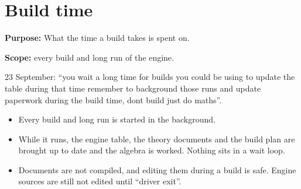 \chapter{\texorpdfstring{Build time}{Build time}}
\label{chap:build-time}

\textbf{Purpose:} What the time a build takes is spent on.

\textbf{Scope:} every build and long run of the engine.

23 September: “you wait a long time for builds you could be using to update the table during that time remember to background those runs and update paperwork during the build time, dont build just do maths”.

\begin{itemize}
\item Every build and long run is started in the background.
\item While it runs, the engine table, the theory documents and the build plan are brought up to date and the algebra is worked. Nothing sits in a wait loop.
\item Documents are not compiled, and editing them during a build is safe. Engine sources are still not edited until “driver exit”.
\end{itemize}
